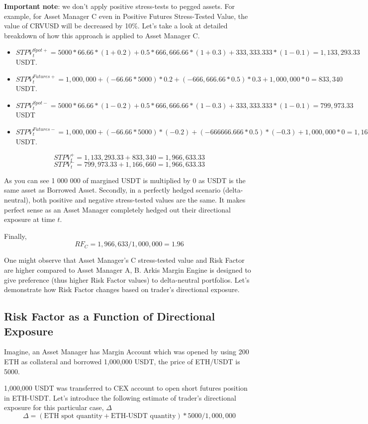\documentclass[conference]{IEEEtran}
\begin{document}
\textbf{Important note}: we don’t apply positive stress-tests to pegged assets. For example, for Asset Manager C even in Positive Futures Stress-Tested Value, the value of CRVUSD will be decreased by 10$\%$. Let's take a look at detailed breakdown of how this approach is applied to Asset Manager C.
\begin{itemize}
	\item $STPV_{t}^{Spot+} = 5000 * 66.66 * (1+0.2) + 0.5 * 666,666.66 * (1+0.3) + 333,333.333 * (1-0.1) = 1,133,293.33$ USDT.
	\item $STPV_{t}^{Futures+} = 1,000,000 + (-66.66 * 5000) * 0.2 + (-666,666.66*0.5) * 0.3 + 1,000,000 * 0 =  833,340$ USDT.
	\item $STPV_{t}^{Spot-} = 5000 * 66.66 * (1-0.2) + 0.5 * 666,666.66 * (1-0.3) + 333,333.333 * (1-0.1) = 799,973.33$ USDT
	\item $STPV_{t}^{Futures-} = 1,000,000 + (-66.66*5000) * (-0.2) + (-666666.666*0.5) * (-0.3)+ 1,000,000 * 0 =  1,166,660
$ USDT.
\end{itemize} 


$$STPV_{t}^{+} = 1,133,293.33+833,340 = 1,966,633.33$$
$$STPV_{t}^{-} = 799,973.33+1,166,660 = 1,966,633.33$$

As you can see 1 000 000 of margined USDT is multiplied by 0 as USDT is the same asset as Borrowed Asset. Secondly, in a perfectly hedged scenario (delta-neutral), both positive and negative stress-tested values are the same. It makes perfect sense as an Asset Manager completely hedged out their directional exposure at time $t$.

Finally, $$RF_{C} = 1,966,633 / 1,000,000 = 1.96$$

One might observe that Asset Manager’s C stress-tested value and Risk Factor are higher compared to Asset Manager A, B. Arkis Margin Engine is designed to give preference (thus higher Risk Factor values) to delta-neutral portfolios. Let’s demonstrate how Risk Factor changes based on trader’s directional exposure. 


\subsection{Risk Factor as a Function of Directional Exposure}

Imagine, an Asset Manager has Margin Account which was opened by using 200 ETH as collateral and borrowed 1,000,000 USDT, the price of ETH/USDT is 5000.

1,000,000 USDT was transferred to CEX account to open short futures position in ETH-USDT. Let’s introduce the following estimate of trader's directional exposure for this particular case, $\Delta$ $$\Delta = (\text{ETH spot quantity} + \text{ETH-USDT quantity}) * 5000 / 1,000,000$$
\end{document}
